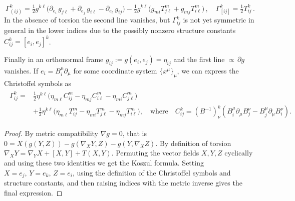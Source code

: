\begin{mytheorem}
\begin{equation}
    \Gamma_{(ij)}^k=\tfrac{1}{2} g^{k\ell} \Big( \partial_{e_i}\,g_{j \ell} + \partial_{e_j}\,g_{i \ell} - \partial_{e_\ell}\,g_{i j}\Big) - \tfrac{1}{2} g^{k\ell} \Big( g_{m i} T^m_{j \ell} + g_{m j} T^m_{i \ell}  \Big)\,,
    \quad \Gamma_{[ij]}^k = \tfrac{1}{2} T^k_{ij}\,.
\end{equation}
In the absence of torsion the second line vanishes, but $\Gamma_{ij}^k$ is not yet symmetric in general in the lower indices due to the possibly nonzero structure constants $C_{ij}^k=[e_i,e_j]^k$.

Finally in an orthonormal frame $g_{ij}:=g(e_i,e_j) = \eta_{ij}$ and the first line $\propto \, \partial g$ vanishes.
If $e_i=B_i^\mu\partial_\mu$ for some coordinate system $\{x^\mu\}_\mu$, we can express the Christoffel symbols as
\begin{align}
\begin{aligned}
    \Gamma_{ij}^k=&\tfrac{1}{2} \eta^{k\ell} \Big( \eta_{m \ell} C^m_{ij} - \eta_{m j} C^m_{i \ell} - \eta_{m i} C^m_{j \ell} \Big) \\
    & +\tfrac{1}{2} \eta^{k\ell} \Big( \eta_{m \ell} T^m_{ij} -\eta_{m i} T^m_{j \ell} - \eta_{m j} T^m_{i \ell}  \Big),\quad \text{where}\quad C_{ij}^k= (B^{-1})^k_\nu \left( B_i^\mu \partial_\mu B_j^\nu - B_j^\mu \partial_\mu B_i^\nu \right).
\end{aligned}
\end{align}
\end{mytheorem}
\begin{proof}
By metric compatibility $\nabla g=0$, that is $0=X(g(Y,Z)) - g(\nabla_X Y,Z) - g(Y, \nabla_X Z)$.
By definition of torsion $\nabla_X Y = \nabla_Y X + [X,Y] + T(X,Y)$.
Permuting the vector fields $X,Y,Z$ cyclically and using these two identities we get the Koszul formula.
Setting \(X=e_j,\, Y=e_k,\, Z=e_i\), using the definition of the Christoffel symbols and structure constants, and then raising indices with the metric inverse gives the final expression.
\end{proof}


